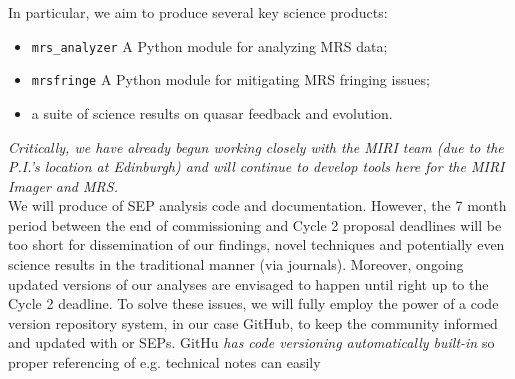 \noindent
In particular, we aim to produce several key science products:
\begin{itemize}
\item {\tt mrs\_analyzer} A Python module for analyzing MRS data; 
\item {\tt mrsfringe} A Python module for mitigating MRS fringing issues; 
\item a suite of science results on quasar feedback and evolution. 
\end{itemize}

\noindent
{\it Critically, we have already begun working closely with the MIRI team (due to the P.I.'s location at Edinburgh) and will continue to develop tools here for the MIRI Imager and MRS.}\\

\noindent
We will produce of SEP analysis code and documentation.  However, the 7
month period between the end of commissioning and Cycle 2 proposal
deadlines will be too short for dissemination of our findings, novel
techniques and potentially even science results in the traditional
manner (via journals). Moreover, ongoing updated versions 
of our analyses are envisaged to happen until right up to the Cycle 2 deadline. 
To solve these issues, we will fully employ the power of a code version
repository system, in our case GitHub, to keep the community informed
and updated with or SEPs. GitHu {\it has code versioning automatically
built-in} so proper referencing of e.g. technical notes can easily






